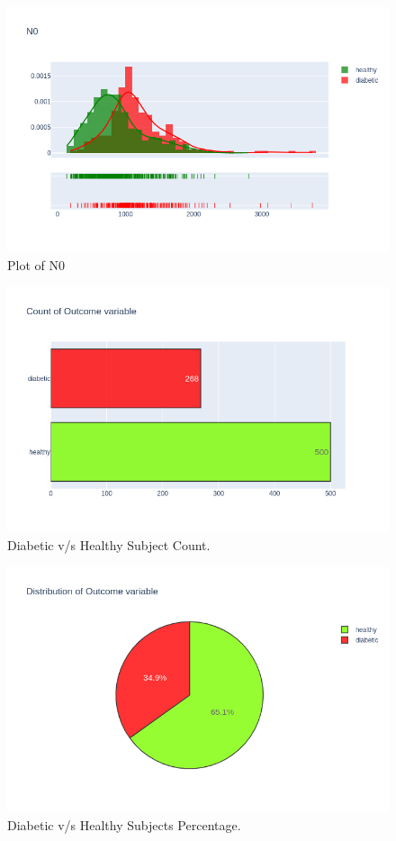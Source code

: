 \documentclass[12pt]{article}
\begin{document}
\begin{figure}[ht]
\centering
\includegraphics[width=1\textwidth]{15.png}
\caption{\label{fig:6} Plot of N0}
\end{figure}

\begin{figure}[ht]
\centering
\includegraphics[width=1\textwidth]{1.png}
\caption{\label{fig:8} Diabetic v/s Healthy Subject Count.}
\end{figure}

\begin{figure}[ht]
\centering
\includegraphics[width=1\textwidth]{2.png}
\caption{\label{fig:9} Diabetic v/s Healthy Subjects Percentage.}
\end{figure}
\end{document}
